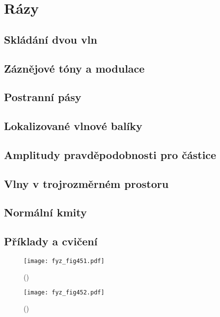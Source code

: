 {
\chapter{Rázy}\label{fyz:IchapXLVIII}
\minitoc
  \section{Skládání dvou vln}\label{fyz:IchapXLVIIIsecI}
  \section{Záznějové tóny a modulace}\label{fyz:IchapXLVIIIsecII}
  \section{Postranní pásy}\label{fyz:IchapXLVIIIsecIII}
  \section{Lokalizované vlnové balíky}\label{fyz:IchapXLVIIIsecIV}
  \section{Amplitudy pravděpodobnosti pro částice}\label{fyz:IchapXLVIIIsecV}
  \section{Vlny v trojrozměrném prostoru}\label{fyz:IchapXLVIIIsecVI}
  \section{Normální kmity}\label{fyz:IchapXLVIIIsecVII}
  \section{Příklady a cvičení}\label{fyz:IchapXLVIIIsecVIII}

    \begin{figure}[ht!] %
      \centering
      \texttt{[image: fyz\_fig451.pdf]}
      \caption{ 
               (\cite[s.~707]{Feynman01})}
      \label{fyz_fig451}
    \end{figure}
    
    \begin{figure}[ht!] %
      \centering
      \texttt{[image: fyz\_fig452.pdf]}
      \caption{ 
               (\cite[s.~707]{Feynman01})}
      \label{fyz_fig452}
    \end{figure}
    
}
